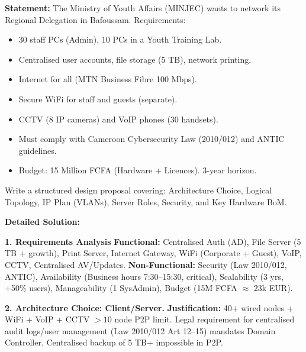 \documentclass[11pt]{article}
\begin{document}
\begin{exoresolu}
\textbf{Statement:}
The Ministry of Youth Affairs (MINJEC) wants to network its Regional Delegation in Bafoussam. Requirements:
\begin{itemize}
    \item 30 staff PCs (Admin), 10 PCs in a Youth Training Lab.
    \item Centralised user accounts, file storage (5 TB), network printing.
    \item Internet for all (MTN Business Fibre 100 Mbps).
    \item Secure WiFi for staff and guests (separate).
    \item CCTV (8 IP cameras) and VoIP phones (30 handsets).
    \item Must comply with Cameroon Cybersecurity Law (2010/012) and ANTIC guidelines.
    \item Budget: 15 Million FCFA (Hardware + Licences). 3-year horizon.
\end{itemize}
Write a structured design proposal covering: Architecture Choice, Logical Topology, IP Plan (VLANs), Server Roles, Security, and Key Hardware BoM.

\tcblower
\textbf{Detailed Solution:}

\noindent\textbf{1. Requirements Analysis}
\textbf{Functional:} Centralised Auth (AD), File Server (5 TB + growth), Print Server, Internet Gateway, WiFi (Corporate + Guest), VoIP, CCTV, Centralised AV/Updates.
\textbf{Non-Functional:} Security (Law 2010/012, ANTIC), Availability (Business hours 7:30--15:30, critical), Scalability (3 yrs, +50\% users), Manageability (1 SysAdmin), Budget (15M FCFA $\approx$ 23k EUR).

\noindent\textbf{2. Architecture Choice: Client/Server.}
\textbf{Justification:} 40+ wired nodes + WiFi + VoIP + CCTV $> 10$ node P2P limit. Legal requirement for centralised audit logs/user management (Law 2010/012 Art 12--15) mandates Domain Controller. Centralised backup of 5 TB+ impossible in P2P.


\end{exoresolu}
\end{document}
